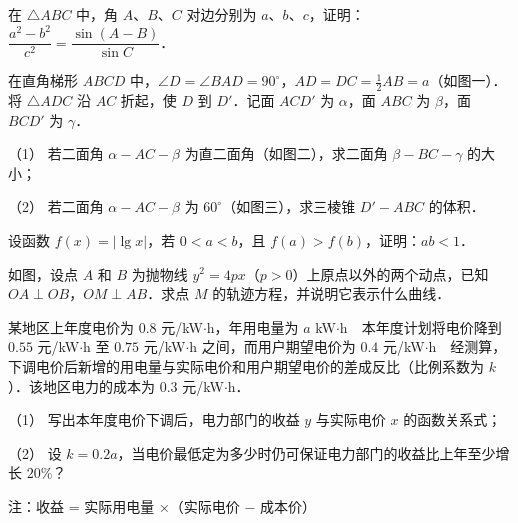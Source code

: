 \begin{question}
在 $\triangle ABC$ 中，角 $A$、$B$、$C$ 对边分别为 $a$、$b$、$c$，证明：$\dfrac{a^2 - b^2}{c^2} = \dfrac{\sin(A - B)}{\sin C}$．

\Needspace{0.4\textheight}
\end{question}
\begin{question}
在直角梯形 $ABCD$ 中，$\angle D = \angle BAD = 90^\circ$，$AD = DC = \frac{1}{2}AB = a$（如图一）．将 $\triangle ADC$ 沿 $AC$ 折起，使 $D$ 到 $D'$．记面 $ACD'$ 为 $\alpha$，面 $ABC$ 为 $\beta$，面 $BCD'$ 为 $\gamma$．

（1） 若二面角 $\alpha-AC-\beta$ 为直二面角（如图二），求二面角 $\beta-BC-\gamma$ 的大小；

（2） 若二面角 $\alpha-AC-\beta$ 为 $60^\circ$（如图三），求三棱锥 $D'-ABC$ 的体积．
\nopagebreak[4]
\begin{center}\end{center}
\nopagebreak[4]
\nopagebreak[4]
\begin{center}\end{center}
\nopagebreak[4]
\nopagebreak[4]
\begin{center}\end{center}
\nopagebreak[4]
\end{question}
\begin{question}
设函数 $f(x) = |\lg x|$，若 $0 < a < b$，且 $f(a) > f(b)$，证明：$ab < 1$．

\Needspace{0.4\textheight}
\end{question}
\begin{question}
如图，设点 $A$ 和 $B$ 为抛物线 $y^2 = 4px$（$p > 0$）上原点以外的两个动点，已知 $OA \perp OB$，$OM \perp AB$．求点 $M$ 的轨迹方程，并说明它表示什么曲线．
\nopagebreak[4]
\begin{center}\end{center}
\nopagebreak[4]
\end{question}
\begin{question}
某地区上年度电价为 $0.8$ 元/kW$\cdot$h，年用电量为 $a$ kW$\cdot$h　本年度计划将电价降到 $0.55$ 元/kW$\cdot$h 至 $0.75$ 元/kW$\cdot$h 之间，而用户期望电价为 $0.4$ 元/kW$\cdot$h　经测算，下调电价后新增的用电量与实际电价和用户期望电价的差成反比（比例系数为 $k$）．该地区电力的成本为 $0.3$ 元/kW$\cdot$h．

（1） 写出本年度电价下调后，电力部门的收益 $y$ 与实际电价 $x$ 的函数关系式；

（2） 设 $k = 0.2a$，当电价最低定为多少时仍可保证电力部门的收益比上年至少增长 $20\%$？

注：收益 = 实际用电量 ×（实际电价 $-$ 成本价）

\Needspace{0.4\textheight}
\end{question}
